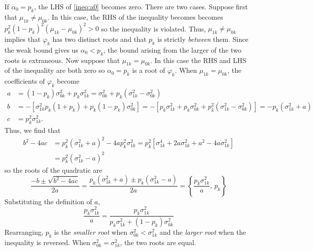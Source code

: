\documentclass[12pt]{article}
\begin{document}
If $\alpha_0 = p_k$, the LHS of \ref{ineq:a0} becomes zero.
There are two cases.
Suppose first that $\mu_{1k} \neq \mu_{0k}$.
In this case, the RHS of the inequality becomes becomes $p_k^2(1-p_k)^2(\mu_{1k} - \mu_{0k})^2 >0$ so the inequality is violated.
Thus, $\mu_{1k} \neq \mu_{0k}$ implies that $\varphi_k$ has two distinct roots and that $p_k$ is strictly \emph{between} them.
Since the weak bound gives us $\alpha_0 < p_k$, the bound arising from the larger of the two roots is extraneous.
Now suppose that $\mu_{1k}=\mu_{0k}$.
In this case the RHS and LHS of the inequality are both zero so $\alpha_0 = p_k$ is a root of $\varphi_k$.
When $\mu_{1k}=\mu_{0k}$, the coefficients of $\varphi_k$ become
\begin{align*}
  a &= (1 - p_k) \sigma_{0k}^2 + p_k \sigma_{1k}^2 = \sigma_{0k}^2 + p_k(\sigma_{1k}^2 - \sigma_{0k}^2)\\
  b &= - \left[ \sigma_{1k}^2 p_k(1 + p_k) + p_k (1 - p_k)\sigma_{0k}^2 \right] = -\left[ p_k\sigma_{1k}^2 + p_k \sigma_{0k}^2 + p_k^2(\sigma_{1k}^2 - \sigma_{0k}^2)  \right] = -p_k\left(\sigma_{1k}^2 + a  \right) \\
  c &= p_k^2 \sigma_{1k}^2. 
\end{align*}
Thus, we find that
\begin{align*}
  b^2 - 4ac &= p_k^2 (\sigma_{1k}^2 + a)^2 - 4a p_k^2 \sigma_{1k}^2 = p_k^2 \left[ \sigma_{1k}^4 + 2a \sigma_{1k}^2 + a^2 - 4a \sigma_{1k}^2 \right]\\
  &= p_k^2\left( \sigma_{1k}^2 - a \right)^2
\end{align*}
so the roots of the quadratic are
\[
  \frac{-b \pm \sqrt{b^2 - 4ac}}{2a} = \frac{p_k(\sigma_{1k}^2 + a) \pm p_k(\sigma_{1k}^2 - a)}{2a} = \left\{\frac{p_k \sigma_{1k}^2}{a}, \, p_k  \right\}
\]
Substituting the definition of $a$,
\[
  \frac{p_k\sigma_{1k}^2}{a} = \frac{p_k \sigma_{1k}^2}{p_k \sigma_{1k}^2 + (1 - p_k) \sigma_{0k}^2}
\]
Rearranging, $p_k$ is the \emph{smaller root} when $\sigma_{0k}^2<\sigma_{1k}^2$ and the \emph{larger root} when the inequality is reversed.
When $\sigma_{0k}^2 = \sigma_{1k}^2$, the two roots are equal.
\end{document}

